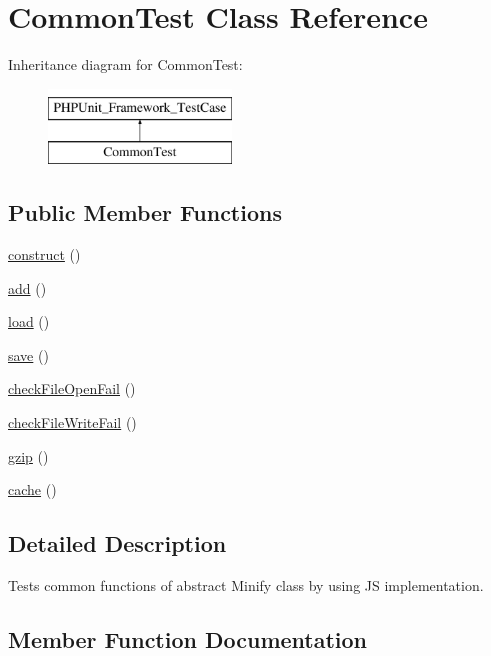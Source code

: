 \hypertarget{classCommonTest}{}\section{Common\+Test Class Reference}
\label{classCommonTest}
Inheritance diagram for Common\+Test\+:\begin{figure}[H]
\begin{center}
\leavevmode
\includegraphics[height=2.000000cm]{classCommonTest}
\end{center}
\end{figure}
\subsection*{Public Member Functions}
\begin{DoxyCompactItemize}
\item 
\hyperlink{classCommonTest_ab24c2942e114fd0e5ad3e712530acce3}{construct} ()
\item 
\hyperlink{classCommonTest_a6fb5e57c6e664a053e04eb4a45ef38ce}{add} ()
\item 
\hyperlink{classCommonTest_ae397efc13c8570a1d2fc52569cee77e5}{load} ()
\item 
\hyperlink{classCommonTest_a37d8fe9055f7f24d9eefaab298d2fa69}{save} ()
\item 
\hyperlink{classCommonTest_aa4ec82358fc46010add14faaf0bfbaed}{check\+File\+Open\+Fail} ()
\item 
\hyperlink{classCommonTest_a19a6dfb20fc094445bc223b2a5e54ec8}{check\+File\+Write\+Fail} ()
\item 
\hyperlink{classCommonTest_afa8f04de315db9a7a06f3a1f0f45e819}{gzip} ()
\item 
\hyperlink{classCommonTest_aef65da0f4f3e140bb7bd908e9c9cf196}{cache} ()
\end{DoxyCompactItemize}


\subsection{Detailed Description}
Tests common functions of abstract Minify class by using JS implementation. 

\subsection{Member Function Documentation}

